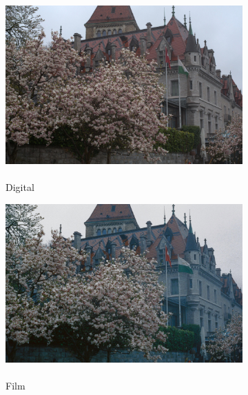 \begin{figure}
    \begin{subfigure}[t]{.24\textwidth}
        \centering
        \includegraphics[width=\linewidth]{figures/digital-castle.png}
        \captionsetup{justification=centering}
        \caption{\\Digital}
      \end{subfigure}
    \hfill
    \begin{subfigure}[t]{.24\textwidth}
        \centering
        \includegraphics[width=\linewidth]{figures/film-castle.png}
        \captionsetup{justification=centering}
        \caption{\\Film}
      \end{subfigure}
    \hfill
    \begin{subfigure}[t]{.24\textwidth}
        \centering

\end{subfigure}
\end{figure}
